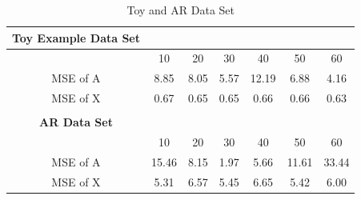 \begin{table}[H]
\centering
\begin{tabular}{|c|c|c|c|c|c|c|}
\hline 
\textbf{Toy Example Data Set} & & & & & & \\ \hline
 & 10 & 20 & 30 & 40 & 50 & 60 \\ 
\hline 
MSE of A & 8.85 & 8.05 & 5.57 & 12.19 & 6.88 & 4.16 \\ 
\hline 
MSE of X & 0.67 & 0.65 & 0.65 & 0.66  & 0.66 & 0.63 \\ 
\hline
\\ \hline
\textbf{AR Data Set} & & & & & & \\ \hline
 & 10 & 20 & 30 & 40 & 50 & 60 \\ 
\hline 
MSE of A & 15.46 & 8.15 & 1.97 & 5.66 & 11.61 & 33.44 \\ 
\hline 
MSE of X  & 5.31 & 6.57 & 5.45 & 6.65  & 5.42 & 6.00 \\ 
\hline
\end{tabular} 
\caption{Toy and AR Data Set}
\end{table}


